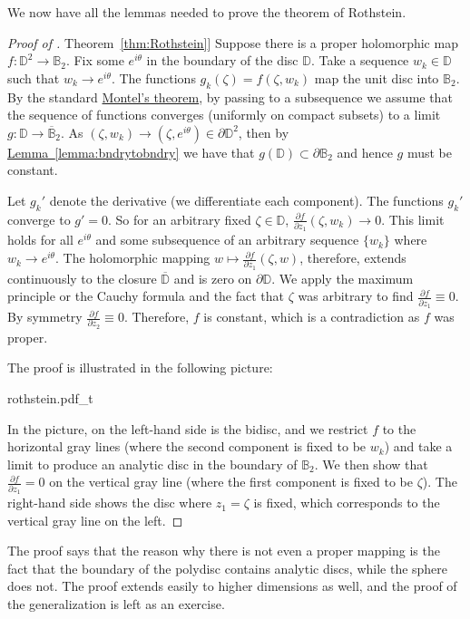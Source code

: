 \documentclass[12pt,openany]{book}
\newcommand{\D}{{\mathbb{D}}}
\newcommand{\bB}{{\mathbb{B}}}
\theoremstyle{plain}
\theoremstyle{remark}
\theoremstyle{definition}
\newenvironment{myfig}{%
    \begin{center}
}{%
    \end{center}
}
\theoremstyle{exercise}
\theoremstyle{example}
\newcommand{\thmref}[1]{\hyperref[#1]{Theorem~\ref*{#1}}}
\newcommand{\lemmaref}[1]{\hyperref[#1]{Lemma~\ref*{#1}}}
\begin{document}
We now have all the lemmas needed to prove the theorem of Rothstein.

\begin{proof}[Proof of \thmref{thm:Rothstein}]
Suppose there is a proper holomorphic map $f \colon \D^2
\to \bB_2$.
Fix some $e^{i\theta}$ in the boundary of the disc $\D$.  Take a sequence
$w_k \in \D$ such that $w_k \to e^{i\theta}$.   The functions
$g_k(\zeta) =  f(\zeta,w_k)$ map the unit disc into $\bB_2$.  By the standard
\hyperref[thm:onevarmontel]{Montel's theorem}, by passing to a subsequence we assume that
the sequence of functions converges (uniformly on compact subsets) to
a limit $g \colon \D \to \overline{\bB}_2$.  As $(\zeta,w_k) \to
(\zeta,e^{i\theta}) \in \partial \D^2$, then by
\lemmaref{lemma:bndrytobndry} we have that $g(\D) \subset \partial \bB_2$
and hence $g$ must be constant.

Let $g_k'$ denote the derivative (we differentiate each component).
The functions $g_k'$ converge to $g' = 0$.
So for an arbitrary fixed $\zeta \in \D$,
$\frac{\partial f}{\partial z_1} (\zeta, w_k) \to 0$.
This limit holds for all $e^{i\theta}$ and some subsequence of
an arbitrary sequence $\{ w_k \}$ where $w_k \to e^{i\theta}$.  The
holomorphic mapping $w \mapsto \frac{\partial f}{\partial z_1} (\zeta, w)$,
therefore, extends continuously
to the closure $\overline{\D}$ and is zero on $\partial \D$.
We apply the maximum
principle or the Cauchy formula and the fact that $\zeta$ was arbitrary to find 
$\frac{\partial f}{\partial z_1} \equiv 0$.  By symmetry
$\frac{\partial f}{\partial z_2} \equiv 0$.  Therefore, $f$ is constant,
which is a contradiction as $f$ was proper.

\pagebreak[2]
The proof is illustrated in the following picture:

\begin{myfig}
{rothstein.pdf_t}
\end{myfig}

In the picture, on the left-hand side is the bidisc, and we
restrict $f$ to the horizontal gray lines (where the second component is
fixed to be $w_k$) and take a limit to produce an analytic disc
in the boundary of $\bB_2$.  We then show that $\frac{\partial f}{\partial
z_1} = 0$ on the vertical gray line (where the first component is fixed to
be $\zeta$).  The right-hand side shows the disc where $z_1 = \zeta$ is
fixed, which corresponds to the vertical gray line on the left.
\end{proof}

The proof says that the reason why there is not even a proper mapping is the fact
that the boundary of the polydisc contains analytic discs, while
the sphere does not.
The proof extends easily to higher dimensions as well, and the proof
of the generalization is left as an exercise.
\end{document}
